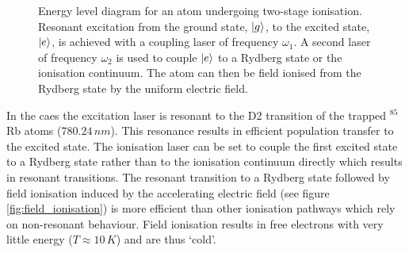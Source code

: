 \begin{figure}[h]
\hspace{0.235\textwidth}
\caption[Title]{Energy level diagram for an atom undergoing two-stage ionisation. Resonant excitation from the ground state, $\ket{g}$, to the excited state, $\ket{e}$, is achieved with a coupling laser of frequency $\omega_1$. A second laser of frequency $\omega_2$ is used to couple $\ket{e}$ to a Rydberg state or the ionisation continuum. The atom can then be field ionised from the Rydberg state by the uniform electric field.}
\label{fig:energy_level}
\end{figure}

In the \gls{caes} the excitation laser is resonant to the D2 transition of the trapped $^{85}$Rb atoms ($780.24\,\unit{nm}$). This resonance results in efficient population transfer to the excited state. The ionisation laser can be set to couple the first excited state to a Rydberg state rather than to the ionisation continuum directly which results in resonant transitions. The resonant transition to a Rydberg state followed by field ionisation induced by the accelerating electric field (see figure \ref{fig:field_ionisation}) is more efficient than other ionisation pathways which rely on non-resonant behaviour. Field ionisation results in free electrons with very little energy ($T\approx10\,\unit{K}$\cite{mcculloch_arbitrarily_2011}) and are thus `cold'.


